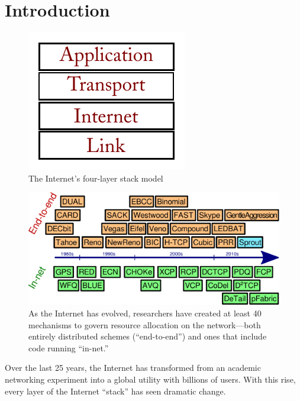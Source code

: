 \chapter{Introduction}
\label{chap:intro}

\begin{figure}
\caption{The Internet's four-layer stack model}
\label{f:stack}
\begin{centering}
\includegraphics{layers.pdf}

\end{centering}
\end{figure}

\begin{figure}
\caption{As the Internet has evolved, researchers have created at
  least 40 mechanisms to govern resource allocation on the
  network---both entirely distributed schemes (``end-to-end'') and
  ones that include code running ``in-net.''}
\label{f:march}

\vspace{\baselineskip}

\begin{centering}
\noindent \includegraphics[width=\textwidth]{march2-all.pdf}

\end{centering}
\end{figure}

Over the last 25 years, the Internet has transformed from an academic
networking experiment into a global utility with billions of
users. With this rise, every layer of the Internet
``stack'' has seen dramatic change.

